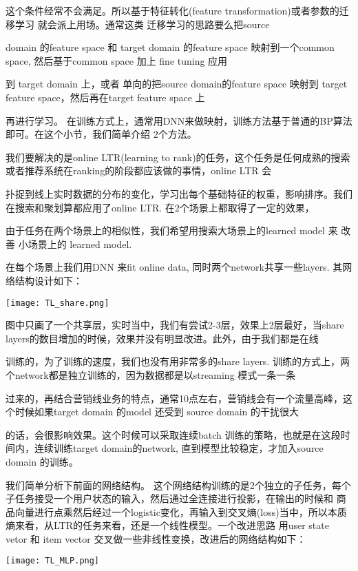 这个条件经常不会满足。所以基于特征转化(feature transformation)或者参数的迁移学习 就会派上用场。通常这类 迁移学习的思路要么把source

domain 的feature space 和 target domain 的feature space 映射到一个common space, 然后基于common space 加上 fine tuning 应用

到 target domain 上，或者 单向的把source domain的feature space 映射到 target feature space，然后再在target feature space 上

再进行学习。 在训练方式上，通常用DNN来做映射，训练方法基于普通的BP算法即可。在这个小节，我们简单介绍 2个方法。

我们要解决的是online LTR(learning to rank)的任务，这个任务是任何成熟的搜索或者推荐系统在ranking的阶段都应该做的事情，online LTR 会

扑捉到线上实时数据的分布的变化，学习出每个基础特征的权重，影响排序。我们在搜索和聚划算都应用了online LTR. 在2个场景上都取得了一定的效果，

由于任务在两个场景上的相似性，我们希望用搜索大场景上的learned model 来 改善 小场景上的 learned model. 

在每个场景上我们用DNN 来fit online data, 同时两个network共享一些layers. 其网络结构设计如下：


\texttt{[image: TL\_share.png]}

图中只画了一个共享层，实时当中，我们有尝试2-3层，效果上2层最好，当share layers的数目增加的时候，效果并没有明显改进。此外，由于我们都是在线

训练的，为了训练的速度，我们也没有用非常多的share layers. 训练的方式上，两个network都是独立训练的，因为数据都是以streaming 模式一条一条

过来的，再结合营销线业务的特点，通常10点左右，营销线会有一个流量高峰，这个时候如果target domain 的model 还受到 source domain 的干扰很大

的话，会很影响效果。这个时候可以采取连续batch 训练的策略，也就是在这段时间内，连续训练target domain的network, 直到模型比较稳定，才加入source domain 的训练。



我们简单分析下前面的网络结构。 这个网络结构训练的是2个独立的子任务，每个子任务接受一个用户状态的输入，然后通过全连接进行投影，在输出的时候和
商品向量进行点乘然后经过一个logistic变化，再输入到交叉熵(loss)当中，所以本质熵来看，从LTR的任务来看，还是一个线性模型。一个改进思路
用user state vetor 和 item vector 交叉做一些非线性变换，改进后的网络结构如下：

\texttt{[image: TL\_MLP.png]}

